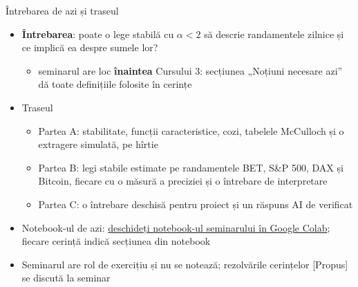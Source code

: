 \begin{frame}{Întrebarea de azi și traseul}
\itemsize{\small}
\begin{itemize}
    \item \textbf{Întrebarea}: poate o lege stabilă cu $\alpha < 2$ să descrie randamentele zilnice și ce implică ea despre sumele lor?
    \begin{itemize}
        \item seminarul are loc \textbf{înaintea} Cursului 3: secțiunea „Noțiuni necesare azi” dă toate definițiile folosite în cerințe
    \end{itemize}
    \item Traseul
    \begin{itemize}
        \item Partea A: stabilitate, funcții caracteristice, cozi, tabelele McCulloch și o extragere simulată, pe hîrtie
        \item Partea B: legi stabile estimate pe randamentele BET, S\&P 500, DAX și Bitcoin, fiecare cu o măsură a preciziei și o întrebare de interpretare
        \item Partea C: o întrebare deschisă pentru proiect și un răspuns AI de verificat
    \end{itemize}
    \item Notebook-ul de azi: \href{\nb}{deschideți notebook-ul seminarului în Google Colab}; fiecare cerință indică secțiunea din notebook
    \item Seminarul are rol de exercițiu și nu se notează; rezolvările cerințelor [Propus] se discută la seminar
\end{itemize}
\end{frame}

